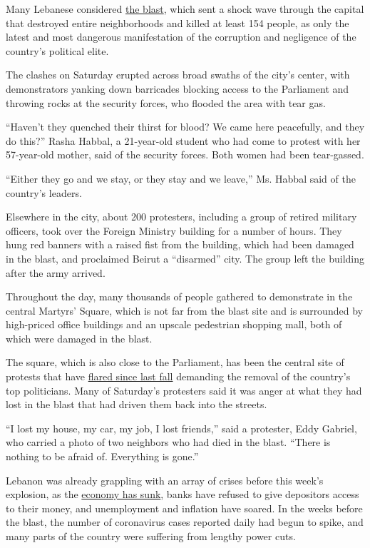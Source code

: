 Many Lebanese considered
\href{https://www.nytimes.com/2020/08/04/world/middleeast/lebanon-explosion.html}{the
blast}, which sent a shock wave through the capital that destroyed
entire neighborhoods and killed at least 154 people, as only the latest
and most dangerous manifestation of the corruption and negligence of the
country's political elite.

The clashes on Saturday erupted across broad swaths of the city's
center, with demonstrators yanking down barricades blocking access to
the Parliament and throwing rocks at the security forces, who flooded
the area with tear gas.

``Haven't they quenched their thirst for blood? We came here peacefully,
and they do this?'' Rasha Habbal, a 21-year-old student who had come to
protest with her 57-year-old mother, said of the security forces. Both
women had been tear-gassed.

``Either they go and we stay, or they stay and we leave,'' Ms. Habbal
said of the country's leaders.

Elsewhere in the city, about 200 protesters, including a group of
retired military officers, took over the Foreign Ministry building for a
number of hours. They hung red banners with a raised fist from the
building, which had been damaged in the blast, and proclaimed Beirut a
``disarmed'' city. The group left the building after the army arrived.

Throughout the day, many thousands of people gathered to demonstrate in
the central Martyrs' Square, which is not far from the blast site and is
surrounded by high-priced office buildings and an upscale pedestrian
shopping mall, both of which were damaged in the blast.

The square, which is also close to the Parliament, has been the central
site of protests that have
\href{https://www.nytimes.com/2019/10/23/world/middleeast/lebanon-protests.html}{flared
since last fall} demanding the removal of the country's top politicians.
Many of Saturday's protesters said it was anger at what they had lost in
the blast that had driven them back into the streets.

``I lost my house, my car, my job, I lost friends,'' said a protester,
Eddy Gabriel, who carried a photo of two neighbors who had died in the
blast. ``There is nothing to be afraid of. Everything is gone.''

Lebanon was already grappling with an array of crises before this week's
explosion, as the
\href{https://www.nytimes.com/2020/07/12/world/middleeast/beirut-lebanon-economic-crisis.html}{economy
has sunk}, banks have refused to give depositors access to their money,
and unemployment and inflation have soared. In the weeks before the
blast, the number of coronavirus cases reported daily had begun to
spike, and many parts of the country were suffering from lengthy power
cuts.

